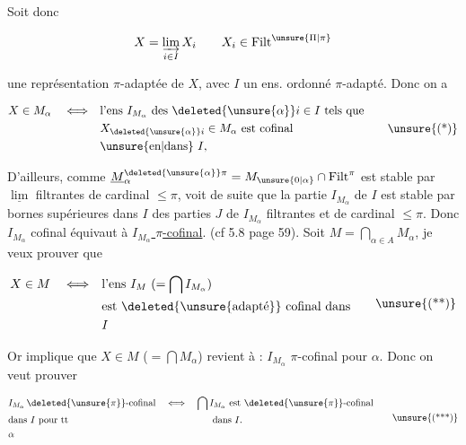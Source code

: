 
Soit donc 

\[
 X=\varinjlim_{i\in I} X_i \qquad X_i\in\mathrm{Filt}^{\unsure{\Pi|\pi}}
\]

une représentation $\pi$-adaptée de $X$, avec $I$ un ens. ordonné $\pi$-adapté. Donc on a

\[
\begin{aligned}
 X\in M_\alpha \quad\Longleftrightarrow\quad
 &\text{l'ens $I_{M_\alpha}$ des $\deleted{\unsure{\alpha}}i\in I$ tels que}\\
 &X_{\deleted{\unsure{\alpha}}i}\in M_\alpha\ \text{est cofinal}\\
 &\text{\unsure{en|dans} $I$,}
\end{aligned}\tag*{\unsure{(*)}}
\]

D'ailleurs, comme $\underline M^{\deleted{\unsure{\alpha}}\pi}_{\alpha}=M_{\unsure{0|\alpha}}\cap\mathrm{Filt}^\pi$ est stable par $\underline{\lim}$ filtrantes de cardinal $\leq\pi$,  voit  de suite que la partie $I_{M_\alpha}$ de $I$ est stable par bornes supérieures dans $I$ des parties $J$ de $I_{M_\alpha}$ filtrantes et de cardinal $\leq\pi$. Donc $I_{M_\alpha}$ cofinal équivaut à \uline{$I_{M_\alpha}$ $\pi$-cofinal}. (cf 5.8 page 59). Soit $M=\bigcap_{\alpha\in A}M_\alpha$, je veux prouver que

\[
\begin{aligned}
 X\in M \quad\Longleftrightarrow\quad &\text{l'ens $I_M$ ($=\bigcap I_{M_\alpha}$)}\\
 &\text{est \deleted{\unsure{adapté}} cofinal dans}\\
 &I
\end{aligned}\tag*{\unsure{(**)}}
\]

Or \unsure{(*)} implique que $X\in M$ ($=\bigcap M_\alpha$) revient à : $I_{M_\alpha}$ $\pi$-cofinal pour  $\alpha$. Donc  on veut prouver

\[
\begin{aligned}
 &I_{M_\alpha}\,\deleted{\unsure{\pi}}\text{-cofinal}
 &&\Longleftrightarrow\quad \bigcap I_{M_\alpha}\ \text{est $\deleted{\unsure{\pi}}$-cofinal}\\
 &\text{dans $I$ pour tt} &&\hspace{5em}\text{dans }I.\\
 &\alpha
\end{aligned}\tag*{\unsure{(***)}}
\]

